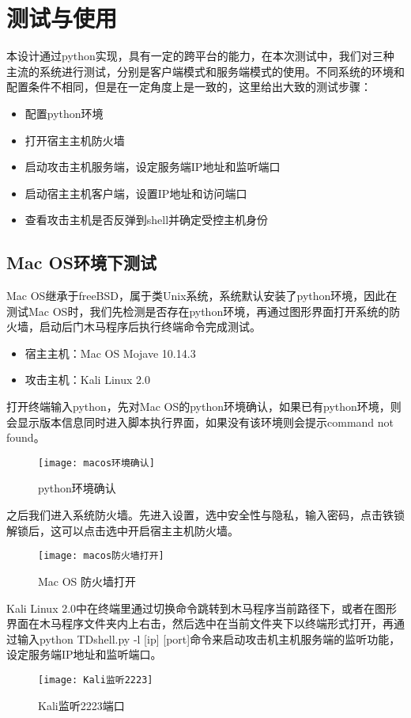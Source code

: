 \chapter{测试与使用}
本设计通过python实现，具有一定的跨平台的能力，在本次测试中，我们对三种主流的系统进行测试，分别是客户端模式和服务端模式的使用。不同系统的环境和配置条件不相同，但是在一定角度上是一致的，这里给出大致的测试步骤：
\begin{itemize}
	\item 配置python环境
	\item 打开宿主主机防火墙
	\item 启动攻击主机服务端，设定服务端IP地址和监听端口
	\item 启动宿主主机客户端，设置IP地址和访问端口
	\item 查看攻击主机是否反弹到shell并确定受控主机身份
\end{itemize}

\section{Mac OS环境下测试}
Mac OS继承于freeBSD，属于类Unix系统，系统默认安装了python环境，因此在测试Mac OS时，我们先检测是否存在python环境，再通过图形界面打开系统的防火墙，启动后门木马程序后执行终端命令完成测试。
\begin{itemize}
	\item 宿主主机：Mac OS Mojave 10.14.3
	\item 攻击主机：Kali Linux 2.0
\end{itemize}






打开终端输入python，先对Mac OS的python环境确认，如果已有python环境，则会显示版本信息同时进入脚本执行界面，如果没有该环境则会提示command not found。
\begin{figure}[h]
\centering
\texttt{[image: macos环境确认]}
\caption{python环境确认}
\label{fig:1}
\end{figure}



之后我们进入系统防火墙。先进入设置，选中安全性与隐私，输入密码，点击铁锁解锁后，这可以点击选中开启宿主主机防火墙。
\begin{figure}[!h]
\centering
\texttt{[image: macos防火墙打开]}
\caption{Mac OS 防火墙打开}
\label{fig:2}
\end{figure}


Kali Linux 2.0中在终端里通过切换命令跳转到木马程序当前路径下，或者在图形界面在木马程序文件夹内上右击，然后选中在当前文件夹下以终端形式打开，再通过输入python TDshell.py -l [ip] [port]命令来启动攻击机主机服务端的监听功能，设定服务端IP地址和监听端口。
\begin{figure}[h]
\centering
\texttt{[image: Kali监听2223]}
\caption{Kali监听2223端口}
\label{fig:3}
\end{figure}

